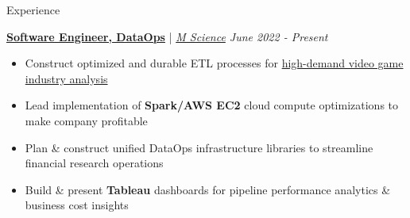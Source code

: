 \documentclass{resume/resume}
\begin{document}
\begin{rSection}{Experience}

  \href{https://www.linkedin.com/posts/m-science-llc_how-m-science-uses-databricks-structured-activity-6953752015013363713-EOTN/}{\bf Software Engineer, DataOps} | {\em \href{https://mscience.com}{M Science} \hfill June 2022 - Present}
  \vspace{-6pt}
  \begin{itemize}[nosep]
    \item Construct optimized and durable ETL processes for \href{https://www.linkedin.com/search/results/content/?fromOrganization=\%5B\%2210801123\%22\%5D&keywords=game&origin=GLOBAL_SEARCH_HEADER&sid=5eJ&sortBy=\%22date_posted\%22}{high-demand video game industry analysis}
    \item Lead implementation of {\bf Spark/AWS EC2} cloud compute optimizations to make company profitable
    \item Plan \& construct unified DataOps infrastructure libraries to streamline financial research operations
    \item Build \& present {\bf Tableau} dashboards for pipeline performance analytics \& business cost insights
  \end{itemize}
  

\end{rSection}
\end{document}
